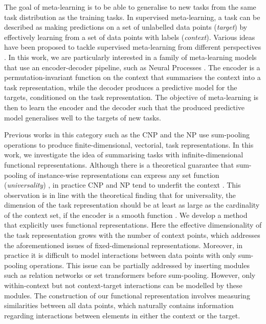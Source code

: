 \documentclass{article}
\theoremstyle{definition}
\begin{document}
The goal of meta-learning is to be able to generalise to new tasks from the same task distribution as the training tasks. In supervised meta-learning, a task can be described as making predictions on a set of unlabelled data points (\emph{target}) by effectively learning from a set of data points with labels (\emph{context}).
Various ideas have been proposed to tackle supervised meta-learning from different perspectives \citep{andrychowicz2016learning,ravi2016optimization,finn2017model,koch2015siamese,snell2017prototypical,vinyals2016matching,santoro2016meta,rusu2018meta}. In this work, we are particularly interested in a family of meta-learning models that use an encoder-decoder pipeline, such as Neural Processes \citep{garnelo2018conditional,garnelo2018neural}. The encoder is a permutation-invariant function on the context that summarises the context into a task representation, while the decoder produces a predictive model for the targets, conditioned on the task representation. The objective of meta-learning is then to learn the encoder and the decoder such that the produced predictive model generalises well to the targets of new tasks. 


Previous works in this category such as the \gls{CNP} and the \gls{NP} \citep{garnelo2018conditional,garnelo2018neural} use sum-pooling operations to produce finite-dimensional, vectorial, task representations. In this work, we investigate the idea of summarising tasks with infinite-dimensional functional representations.
Although there is a theoretical guarantee that sum-pooling of instance-wise representations can express any set function (\textit{universality}) \citep{zaheer2017deep,bloem2019probabilistic}, in practice \gls{CNP} and \gls{NP} tend to underfit the context \citep{kim2019attentive}. 
This observation is in line with the theoretical finding that for universality, the dimension of the task representation should be at least as large as the cardinality of the context set, if the encoder is a smooth function \citet{wagstaff2019limitations}. 
We develop a method that explicitly uses functional representations. Here the effective dimensionality of the task representation grows with the number of context points, which addresses the aforementioned issues of fixed-dimensional representations.
Moreover, in practice it is difficult to model interactions between data points with only sum-pooling operations. This issue can be partially addressed by inserting modules such as relation networks \citep{sung2018learning,rusu2018meta} or set transformers \citep{lee2019set} before sum-pooling. However, only within-context but not context-target interactions can be modelled by these modules.
The construction of our functional representation involves measuring similarities between all data points, which naturally contains information regarding interactions between elements in either the context or the target.
\end{document}

